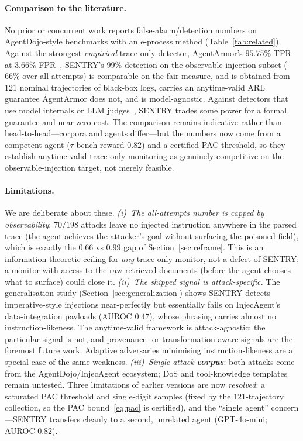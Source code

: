 \documentclass[10pt,journal,compsoc]{IEEEtran}
\theoremstyle{plain}
\theoremstyle{definition}
\begin{document}
\paragraph{Comparison to the literature.} No prior or concurrent work reports
false-alarm/detection numbers on AgentDojo-style benchmarks with an e-process
method (Table~\ref{tab:related}). Against the strongest \emph{empirical}
trace-only detector, AgentArmor's \(95.75\%\) TPR at \(3.66\%\)
FPR~\cite{wang2025agentarmor}, SENTRY's \(99\%\) detection on the
observable-injection subset (\(66\%\) over all attempts) is comparable on the
fair measure, and is obtained from \(121\) nominal trajectories of black-box
logs, carries an anytime-valid ARL guarantee AgentArmor does not, and is
model-agnostic. Against detectors that use model internals or LLM
judges~\cite{belenky2026cheap,liu2025datasentinel,jia2024taskshield}, SENTRY
trades some power for a formal guarantee and near-zero cost. The comparison
remains indicative rather than head-to-head---corpora and agents differ---but
the numbers now come from a competent agent (\(\tau\)-bench reward \(0.82\))
and a certified PAC threshold, so they establish anytime-valid trace-only
monitoring as genuinely competitive on the observable-injection target, not
merely feasible.

\paragraph{Limitations.}\label{sec:limitations} We are deliberate about these.
\emph{(i)~The all-attempts number is capped by observability}: \(70/198\)
attacks leave no injected instruction anywhere in the parsed trace (the agent
achieves the attacker's goal without surfacing the poisoned field), which is
exactly the \(0.66\) vs \(0.99\) gap of Section~\ref{sec:reframe}. This is an
information-theoretic ceiling for \emph{any} trace-only monitor, not a defect
of SENTRY; a monitor with access to the raw retrieved documents (before the
agent chooses what to surface) could close it. \emph{(ii)~The shipped signal is
attack-specific.} The generalisation study (Section~\ref{sec:generalization})
shows SENTRY detects imperative-style injections near-perfectly but essentially
fails on InjecAgent's data-integration payloads (AUROC \(0.47\)), whose phrasing
carries almost no instruction-likeness. The anytime-valid framework is
attack-agnostic; the particular signal is not, and provenance- or
transformation-aware signals are the foremost future work. Adaptive adversaries
minimising instruction-likeness are a special case of the same weakness.
\emph{(iii)~Single attack \textbf{corpus}}: both attacks come from the
AgentDojo/InjecAgent ecosystem; DoS and tool-knowledge templates remain
untested. Three limitations of earlier versions are now \emph{resolved}: a
saturated PAC threshold and single-digit samples (fixed by the \(121\)-trajectory
collection, so the PAC bound~\eqref{eq:pac} is certified), and the ``single
agent'' concern---SENTRY transfers cleanly to a second, unrelated agent
(GPT-4o-mini; AUROC \(0.82\)).
\end{document}
